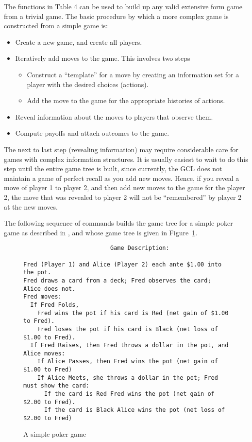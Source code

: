 The functions in Table 4 can be used to build up any valid extensive
form game from a trivial game.  The basic procedure by which a more
complex game is constructed from a simple game is:

\begin{itemize}
\item
Create a new game, and create all players.  
\item
Iteratively add moves to the game.  This involves two steps
\begin{itemize}
\item
Construct a ``template'' for a move by creating an information set for
a player with the desired choices (actions).  

\item
Add the move to the game for the appropriate histories of actions.  
\end{itemize}
\item
Reveal information about the moves to players that observe them.  

\item
Compute payoffs and attach outcomes to the game.  
\end{itemize}

The next to last step (revealing information) may require considerable
care for games with complex information structures.  It is usually
easiest to wait to do this step until the entire game tree is built,
since currently, the GCL does not maintain a game of perfect recall as
you add new moves.  Hence, if you reveal a move of player 1 to player
2, and then add new moves to the game for the player 2, the move that
was revealed to player 2 will not be ``remembered'' by player 2 at the
new moves.

The following sequence of commands builds the game tree for a simple
poker game as described in \cite{Mye:91}, and whose game tree is given
in Figure~\ref{fig:poker}.  

\begin{figure}[htp]
\label{fig:poker}
\vspace{.25in}
\begin{verbatim} 
                         Game Description:

Fred (Player 1) and Alice (Player 2) each ante $1.00 into the pot.
Fred draws a card from a deck; Fred observes the card; Alice does not. 
Fred moves:
  If Fred Folds, 
    Fred wins the pot if his card is Red (net gain of $1.00 to Fred).
    Fred loses the pot if his card is Black (net loss of $1.00 to Fred).
  If Fred Raises, then Fred throws a dollar in the pot, and Alice moves:
    If Alice Passes, then Fred wins the pot (net gain of $1.00 to Fred)
    If Alice Meets, she throws a dollar in the pot; Fred must show the card: 
      If the card is Red Fred wins the pot (net gain of $2.00 to Fred).
      If the card is Black Alice wins the pot (net loss of $2.00 to Fred)
\end{verbatim}
\caption{A simple poker game}
\end{figure}
\medskip

